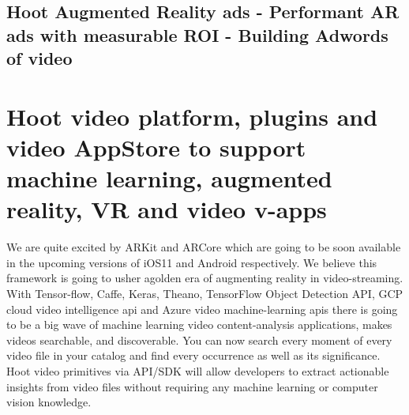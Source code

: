 \documentclass{article}
\begin{document}
%
\subsection{Hoot Augmented Reality ads - Performant AR ads with
  measurable ROI - Building Adwords of video }



\section{Hoot video platform, plugins and video AppStore to support machine learning,
  augmented reality, VR and video v-apps}
We are quite excited by ARKit and ARCore which are going to be soon available in the upcoming versions of iOS11 and Android respectively. We believe this framework is going to usher agolden era of augmenting reality in video-streaming. With Tensor-flow,
Caffe, Keras, Theano, TensorFlow Object Detection API, GCP cloud
video intelligence api and Azure video machine-learning apis there is going to be a
big wave of machine learning video content-analysis applications,
makes videos searchable, and discoverable. You can now search every
moment of every video file in your catalog and find every occurrence
as well as its significance. Hoot video primitives via API/SDK will allow developers to extract
actionable insights from video files without requiring any machine
learning or computer vision knowledge. 
\end{document}
